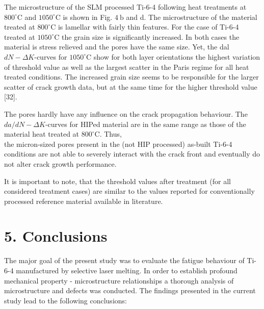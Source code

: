 \documentclass[10pt]{article}
\begin{document}
The microstructure of the SLM processed Ti-6-4 following heat treatments at $800^{\circ} \mathrm{C}$ and $1050^{\circ} \mathrm{C}$ is shown in Fig. $4 \mathrm{~b}$ and d. The microstructure of the material treated at $800^{\circ} \mathrm{C}$ is lamellar with fairly thin features. For the case of Ti-6-4 treated at $1050^{\circ} \mathrm{C}$ the grain size is significantly increased. In both cases the material is stress relieved and the pores have the same size. Yet, the dal $d N-\Delta K$-curves for $1050^{\circ} \mathrm{C}$ show for both layer orientations the highest variation of threshold value as well as the largest scatter in the Paris regime for all heat treated conditions. The increased grain size seems to be responsible for the larger scatter of crack growth data, but at the same time for the higher threshold value [32].

The pores hardly have any influence on the crack propagation behaviour. The $d a / d N-\Delta K$-curves for HIPed material are in the same range as those of the material heat treated at $800^{\circ} \mathrm{C}$. Thus,\\
the micron-sized pores present in the (not HIP processed) as-built Ti-6-4 conditions are not able to severely interact with the crack front and eventually do not alter crack growth performance.

It is important to note, that the threshold values after treatment (for all considered treatment cases) are similar to the values reported for conventionally processed reference material available in literature.

\section*{5. Conclusions}
The major goal of the present study was to evaluate the fatigue behaviour of Ti-6-4 manufactured by selective laser melting. In order to establish profound mechanical property - microstructure relationships a thorough analysis of microstructure and defects was conducted. The findings presented in the current study lead to the following conclusions:
\end{document}
